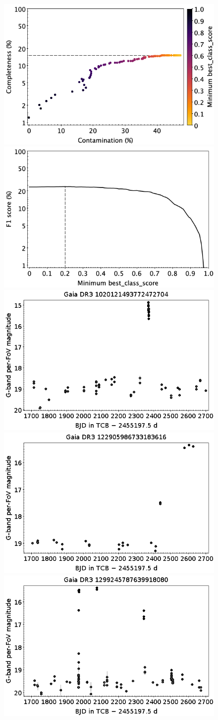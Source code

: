 \documentclass[longauth]{aa}
\begin{document}
\begin{appendix}
\begin{figure}
\centering
{} \includegraphics[width=0.45\hsize]{figures/appendix/CV_cls_scc.png}  
\hspace{2mm}
 \includegraphics[width=0.45\hsize]{figures/appendix/CV_cls_sf1.png} \\ 
\vspace{4mm}
 \includegraphics[width=0.45\hsize]{figures/appendix/CV-6.png}  
\hspace{2mm}
 \includegraphics[width=0.45\hsize]{figures/appendix/CV-51.png} \\
\vspace{4mm}
 \includegraphics[width=0.45\hsize]{figures/appendix/CV-57.png}  

\end{figure}
\end{appendix}
\end{document}

